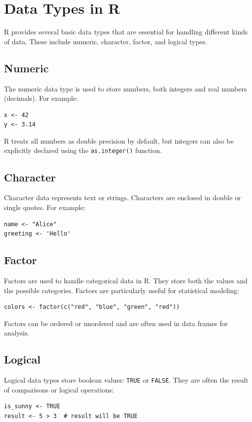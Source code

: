 \documentclass[12pt]{book}
\begin{document}
\section{Data Types in R}
R provides several basic data types that are essential for handling different kinds of data. These include numeric, character, factor, and logical types.

\subsection{Numeric}
The numeric data type is used to store numbers, both integers and real numbers (decimals). For example:
\begin{verbatim}
x <- 42
y <- 3.14
\end{verbatim}
R treats all numbers as double precision by default, but integers can also be explicitly declared using the \texttt{as.integer()} function.

\subsection{Character}
Character data represents text or strings. Characters are enclosed in double or single quotes. For example:
\begin{verbatim}
name <- "Alice"
greeting <- 'Hello'
\end{verbatim}

\subsection{Factor}
Factors are used to handle categorical data in R. They store both the values and the possible categories. Factors are particularly useful for statistical modeling:
\begin{verbatim}
colors <- factor(c("red", "blue", "green", "red"))
\end{verbatim}
Factors can be ordered or unordered and are often used in data frames for analysis.

\subsection{Logical}
Logical data types store boolean values: \texttt{TRUE} or \texttt{FALSE}. They are often the result of comparisons or logical operations:
\begin{verbatim}
is_sunny <- TRUE
result <- 5 > 3  # result will be TRUE
\end{verbatim}
\end{document}
